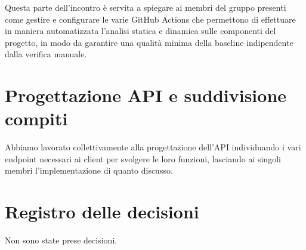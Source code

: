 \documentclass{article}
\begin{document}
Questa parte dell'incontro è servita a spiegare ai membri del gruppo presenti come gestire e configurare le varie GitHub Actions che permettono di effettuare in maniera automatizzata l'analisi statica e dinamica sulle componenti del progetto, in modo da garantire una qualità minima della baseline indipendente dalla verifica manuale.


\section{Progettazione API e suddivisione compiti}%
\label{sec:progettazione_api_e_suddivisione_compiti}

Abbiamo lavorato collettivamente alla progettazione dell'API individuando i vari endpoint necessari ai client per svolgere le loro funzioni, lasciando ai singoli membri l'implementazione di quanto discusso.


\newpage
\section{Registro delle decisioni}%
\label{sec:registro_delle_decisioni}

Non sono state prese decisioni.

\end{document}
